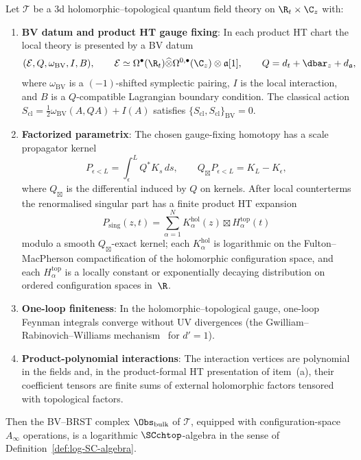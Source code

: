 \begin{theorem}
\label{thm:physics-bridge}
Let $\mathcal{T}$ be a 3d holomorphic--topological quantum field theory on $\R_t \times \C_z$ with:
\begin{enumerate}[label=(\alph*)]
\item \textbf{BV datum and product HT gauge fixing}: In each product
HT chart the local theory is presented by a BV datum
\[
(\mathcal E,Q,\omega_{\mathrm{BV}},I,B),\qquad
\mathcal E\simeq
\Omega^\bullet(\R_t)\widehat\otimes\Omega^{0,\bullet}(\C_z)
\otimes\mathfrak a[1],\qquad
Q=d_t+\dbar_z+d_{\mathfrak a},
\]
where $\omega_{\mathrm{BV}}$ is a $(-1)$-shifted symplectic pairing,
$I$ is the local interaction, and $B$ is a $Q$-compatible Lagrangian
boundary condition. The classical action
$S_{\mathrm{cl}}=\frac12\omega_{\mathrm{BV}}(A,QA)+I(A)$ satisfies
$\{S_{\mathrm{cl}},S_{\mathrm{cl}}\}_{\mathrm{BV}} = 0$.

\item \textbf{Factorized parametrix}: The chosen gauge-fixing
homotopy has a scale propagator kernel
\[
P_{\epsilon<L}=\int_\epsilon^L Q^*K_s\,ds,\qquad
Q_{\boxtimes}P_{\epsilon<L}=K_L-K_\epsilon,
\]
where $Q_{\boxtimes}$ is the differential induced by $Q$ on kernels.
After local counterterms the renormalised singular part has a finite
product HT expansion
\[
 P_{\mathrm{sing}}(z,t)=\sum_{\alpha=1}^{N} K_\alpha^{\mathrm{hol}}(z)
 \boxtimes H_\alpha^{\mathrm{top}}(t)
\]
modulo a smooth $Q_{\boxtimes}$-exact kernel; each
$K_\alpha^{\mathrm{hol}}$ is logarithmic on the Fulton--MacPherson
compactification of the holomorphic configuration space, and each
$H_\alpha^{\mathrm{top}}$ is a locally constant or exponentially
decaying distribution on ordered configuration spaces in~$\R$.

\item \textbf{One-loop finiteness}: In the holomorphic--topological
gauge, one-loop Feynman integrals converge without UV divergences
(the Gwilliam--Rabinovich--Williams mechanism~\cite{GRW21} for
$d' = 1$).

\item \textbf{Product-polynomial interactions}: The interaction
vertices are polynomial in the fields and, in the product-formal HT
presentation of item~\textup{(a)}, their coefficient tensors are
finite sums of external holomorphic factors tensored with
topological factors.
\end{enumerate}
Then the BV--BRST complex $\Obs_{\mathrm{bulk}}$ of $\mathcal{T}$, equipped with configuration-space $A_\infty$ operations, is a logarithmic $\SCchtop$-algebra in the sense of Definition~\ref{def:log-SC-algebra}.
\end{theorem}

